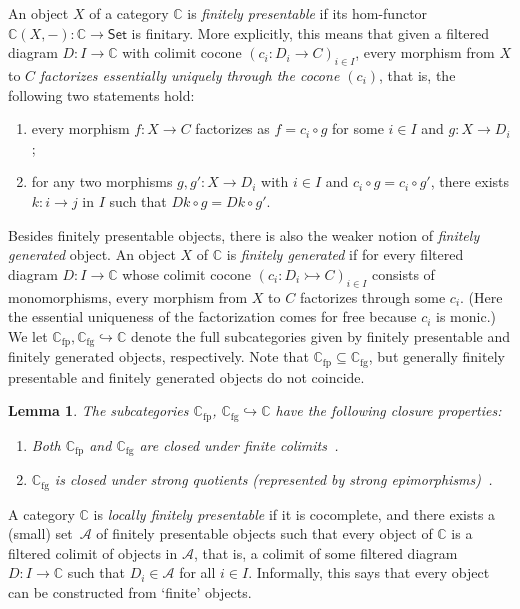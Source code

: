 \documentclass[10pt,a4paper]{article}
\newtheorem{lemma}[theorem]{Lemma}
\theoremstyle{definition}
\theoremstyle{remark}
\numberwithin{equation}{section}
\providecommand{\catname}{\mathsf}
\def\Set{\catname{Set}}
\newcommand{\lfplong}{locally finitely presentable\xspace}
\newcommand{\seq}{\subseteq}
\providecommand{\C}{}
\newcommand{\fp}{{\mathrm{fp}}}
\newcommand{\fg}{{\mathrm{fg}}}
\renewcommand{\C}{{\mathbb{C}}}
\newcommand{\A}{\mathcal{A}}
\newcommand{\monoto}{\rightarrowtail}
\newcommand{\subto}{\hookrightarrow}
\newcommand{\resetCurThmBraces}{  \gdef\curThmBraceOpen{(}  \gdef\curThmBraceClose{)}}
\newcommand{\removeThmBraces}{  \gdef\curThmBraceOpen{}  \gdef\curThmBraceClose{}}
\newenvironment{notheorembrackets}{\removeThmBraces}{\resetCurThmBraces}
\theoremstyle{plain}
\theoremstyle{definition}
\begin{document}
An object $X$ of a category $\C$ is \emph{finitely presentable} if its hom-functor $\C(X,-)\colon \C\to \Set$ is finitary. More explicitly, this means that given a filtered diagram $D\colon I\to \C$ with colimit cocone $(c_i\colon D_i\to C)_{i\in I}$, every morphism from $X$ to $C$ \emph{factorizes essentially uniquely through the cocone $(c_i)$}, that is, the following two statements hold:
\begin{enumerate}
\item every morphism $f\colon X\to C$ factorizes as $f=c_i\circ g$ for some $i\in I$ and $g\colon X\to D_i$;
\item for any two morphisms $g,g'\colon X\to D_i$ with $i\in I$ and $c_i\circ g = c_i\circ g'$, there exists $k\colon i\to j$ in $I$ such that $Dk\circ g = Dk\circ g'$.
\end{enumerate}
Besides finitely presentable objects, there is also the weaker notion of \emph{finitely generated} object. An object $X$ of $\C$ is \emph{finitely generated} if for every filtered diagram $D\colon I\to \C$ whose colimit cocone $(c_i\colon D_i\monoto C)_{i\in I}$ consists of monomorphisms, every morphism from $X$ to $C$ factorizes through some $c_i$. (Here the essential uniqueness of the factorization comes for free because $c_i$ is monic.) We let $\C_\fp,\C_\fg\hookrightarrow \C$ denote the full subcategories given by finitely presentable and finitely generated objects, respectively. Note that $\C_\fp\seq \C_\fg$, but generally finitely presentable and finitely generated objects do not coincide. 

\begin{notheorembrackets}
\begin{lemma}\label{lem:fp-fp-fin-colimits} The subcategories $\C_\fp$, $\C_\fg \subto \C$ have the following closure properties:
\begin{enumerate}
\item Both $\C_\fp$ and $\C_\fg$ are closed under finite colimits~\cite[Prop.~1.3]{adamek_rosicky_1994}. 
\item $\C_\fg$ is closed under strong quotients (represented by strong epimorphisms)~\cite[Prop.~1.69]{adamek_rosicky_1994}.
\end{enumerate}
\end{lemma}
\end{notheorembrackets}

A category $\C$ is \emph{\lfplong} if it is cocomplete, and there exists a (small) set~$\A$ of finitely presentable objects such that every object of $\C$ is a filtered colimit of objects in $\A$, that is, a colimit of some filtered diagram $D\colon I\to \C$ such that $D_i\in \A$ for all $i\in I$. Informally, this says that every object can be constructed from `finite' objects.
\end{document}
